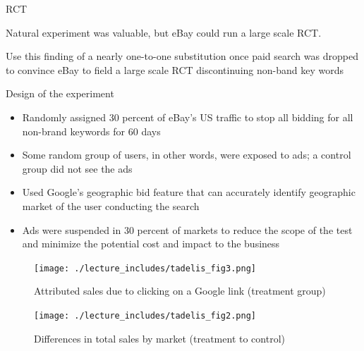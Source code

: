\documentclass{beamer}
\begin{document}
\begin{frame}{RCT}

Natural experiment was valuable, but eBay could run a large scale RCT.

\bigskip


Use this finding of a nearly one-to-one substitution once paid search was dropped to convince eBay to field a large scale RCT discontinuing non-band key words

\bigskip


\end{frame}

\begin{frame}{Design of the experiment}

\begin{itemize}
\item Randomly assigned 30 percent of eBay's US traffic to stop all bidding for all non-brand keywords for 60 days
\item Some random group of users, in other words, were exposed to ads; a control group did not see the ads
\item Used Google's geographic bid feature that can accurately identify geographic market of the user conducting the search
\item Ads were suspended in 30 percent of markets to reduce the scope of the test and minimize the potential cost and impact to the business
\end{itemize}

\end{frame}

\begin{frame}

\begin{figure}
\begin{center}
\texttt{[image: ./lecture\_includes/tadelis\_fig3.png]}
\caption{Attributed sales due to clicking on a Google link (treatment group)}
\end{center}
\end{figure}

\end{frame}


\begin{frame}

\begin{figure}
\begin{center}
\texttt{[image: ./lecture\_includes/tadelis\_fig2.png]}
\caption{Differences in total sales by market (treatment to control)}
\end{center}
\end{figure}

\end{frame}
\end{document}
